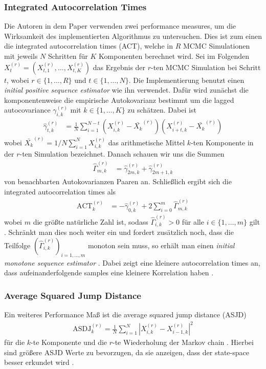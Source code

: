 \documentclass{scrartcl}
\begin{document}
    \subsubsection{Integrated Autocorrelation Times}
    Die Autoren in dem Paper \cite{lau2019} verwenden zwei performance measures, um die Wirksamkeit des implementierten
    Algorithmus zu untersuchen. Dies ist zum einen die integrated autocorrelation times (ACT), welche in $R$ MCMC
    Simulationen mit jeweils $N$ Schritten für $K$ Komponenten berechnet wird. Sei im Folgenden
    $X_t^{(r)}=(X_{t,1}^{(r)},\dots,X_{t,K}^{(r)})$ das Ergebnis der $r$-ten MCMC Simulation bei Schritt $t$, wobei
    $r\in\{1,\dots,R\}$ und $t\in\{1,\dots,N\}$. Die Implementierung benutzt einen \textit{initial positive sequence estimator}
    wie ihn \cite{geyer1992} verwendet. Dafür wird zunächst die komponentenweise die empirische Autokovarianz bestimmt um
    die lagged autocovariance $\gamma_{i,k}^{(r)}$ mit $k\in\{1,\dots,K\}$ zu schätzen. Dabei ist
    \begin{align*}
        \hat{\gamma}_{t,k}^{(r)}&=\frac{1}{N}\sum\limits_{i=1}^{N-t}(X_{i,k}^{(r)}-\bar{X_k}^{(r)})(X_{i+t,k}^{(r)}-\bar{X_k}^{(r)})
    \end{align*}
    wobei $\bar{X_k}^{(r)}=1/N\sum\nolimits_{i=1}^NX_{i,k}^{(r)}$ das arithmetische Mittel $k$-ten Komponente in der $r$-ten
    Simulation bezeichnet. Danach schauen wir uns die Summen
    \begin{align*}
        \hat{\Gamma}_{m,k}^{(r)} &= \hat{\gamma}_{2m,k}^{(r)} + \hat{\gamma}_{2m+1,k}^{(r)}
    \end{align*}
    von benachbarten Autokovarianzen Paaren an. Schließlich ergibt sich die integrated autocorrelation times als
    \begin{align*}
        \text{ACT}_k^{(r)}&=-\hat{\gamma}_{0,k}^{(r)}+2\sum\limits_{i=0}^{m}\hat{\Gamma}_{m,k}^{(r)}
    \end{align*}
    wobei $m$ die größte natürliche Zahl ist, sodass $\hat{\Gamma}_{i,k}^{(r)} > 0$ für alle $i\in\{1,\dots,m\}$ gilt
    \cite{geyer1992}. Schränkt man dies noch weiter ein und fordert zusätzlich noch, dass
    die Teilfolge $(\hat{\Gamma}_{i,k}^{(r)})_{i=1,\dots,m}$ monoton sein muss, so erhält man einen
    \textit{initial monotone sequence estimator} \cite{geyer1992}. Dabei zeigt eine kleinere autocorrelation times an, dass
    aufeinanderfolgende samples eine kleinere Korrelation haben \cite{lau2019}.
    \subsubsection{Average Squared Jump Distance}
    Ein weiteres Performance Maß ist die average squared jump distance (ASJD)
    \begin{align*}
        \text{ASDJ}_k^{(r)}=\frac{1}{N}\sum\limits_{i=1}^N|X_{i,k}^{(r)}-X_{i-1,k}^{(r)}|^2
    \end{align*}
    für die $k$-te Komponente und die $r$-te Wiederholung der Markov chain \cite{lau2019}.
    Hierbei sind größere ASJD Werte zu bevorzugen, da sie anzeigen, dass der state-space besser erkundet wird \cite{lau2019}.
\end{document}
